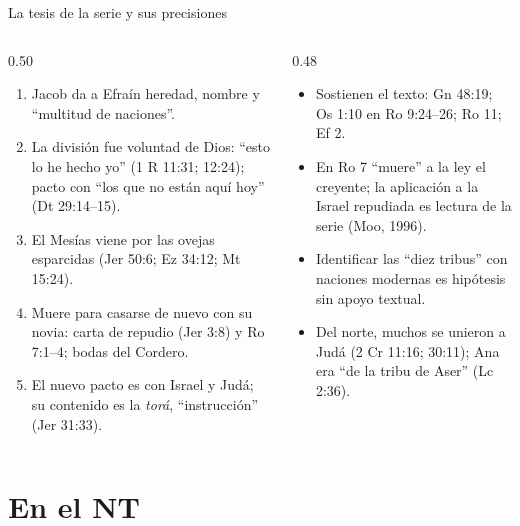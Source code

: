 \begin{frame}{La tesis de la serie y sus precisiones}
\begin{columns}[t,onlytextwidth]
\begin{column}{0.50\textwidth}\scriptsize
{}
\begin{enumerate}
\item Jacob da a Efraín heredad, nombre y ``multitud de naciones''.
\item La división fue voluntad de Dios: ``esto lo he hecho yo'' (1 R 11:31; 12:24); pacto con ``los que no están aquí hoy'' (Dt 29:14--15).
\item El Mesías viene por las ovejas esparcidas (Jer 50:6; Ez 34:12; Mt 15:24).
\item Muere para casarse de nuevo con su novia: carta de repudio (Jer 3:8) y Ro 7:1--4; bodas del Cordero.
\item El nuevo pacto es con Israel y Judá; su contenido es la \emph{torá}, ``instrucción'' (Jer 31:33).
\end{enumerate}
\end{column}
\begin{column}{0.48\textwidth}\scriptsize
{}
\begin{itemize}
\item Sostienen el texto: Gn 48:19; Os 1:10 en Ro 9:24--26; Ro 11; Ef 2.
\item En Ro 7 ``muere'' a la ley el creyente; la aplicación a la Israel repudiada es lectura de la serie (Moo, 1996).
\item Identificar las ``diez tribus'' con naciones modernas es hipótesis sin apoyo textual.
\item Del norte, muchos se unieron a Judá (2 Cr 11:16; 30:11); Ana era ``de la tribu de Aser'' (Lc 2:36).
\end{itemize}
\end{column}
\end{columns}
\end{frame}

\section{En el NT}

